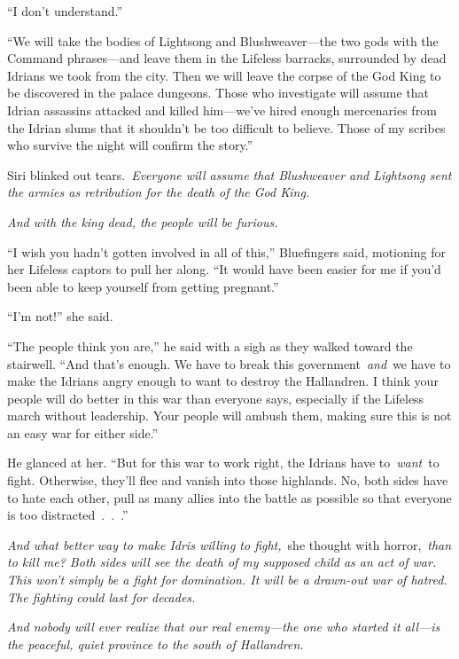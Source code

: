 “I don’t understand.”

“We will take the bodies of Lightsong and Blushweaver—the two gods with the Command phrases—and leave them in the Lifeless barracks, surrounded by dead Idrians we took from the city. Then we will leave the corpse of the God King to be discovered in the palace dungeons. Those who investigate will assume that Idrian assassins attacked and killed him—we’ve hired enough mercenaries from the Idrian slums that it shouldn’t be too difficult to believe. Those of my scribes who survive the night will confirm the story.”

Siri blinked out tears.~\textit{Everyone will assume that Blushweaver and Lightsong sent the armies as retribution for the death of the God King.}

\textit{And with the king dead, the people will be furious.}

“I wish you hadn’t gotten involved in all of this,” Bluefingers said, motioning for her Lifeless captors to pull her along. “It would have been easier for me if you’d been able to keep yourself from getting pregnant.”

“I’m not!” she said.

“The people think you are,” he said with a sigh as they walked toward the stairwell. “And that’s enough. We have to break this government~\textit{and}~we have to make the Idrians angry enough to want to destroy the Hallandren. I think your people will do better in this war than everyone says, especially if the Lifeless march without leadership. Your people will ambush them, making sure this is not an easy war for either side.”

He glanced at her. “But for this war to work right, the Idrians have to~\textit{want}~to fight. Otherwise, they’ll flee and vanish into those highlands. No, both sides have to hate each other, pull as many allies into the battle as possible so that everyone is too distracted~.~.~.”

\textit{And what better way to make Idris willing to fight,}~she thought with horror,~\textit{than to kill me? Both sides will see the death of my supposed child as an act of war. This won’t simply be a fight for domination. It will be a drawn-out war of hatred. The fighting could last for decades.}

\textit{And nobody will ever realize that our real enemy—the one who started it all—is the peaceful, quiet province to the south of Hallandren.}

